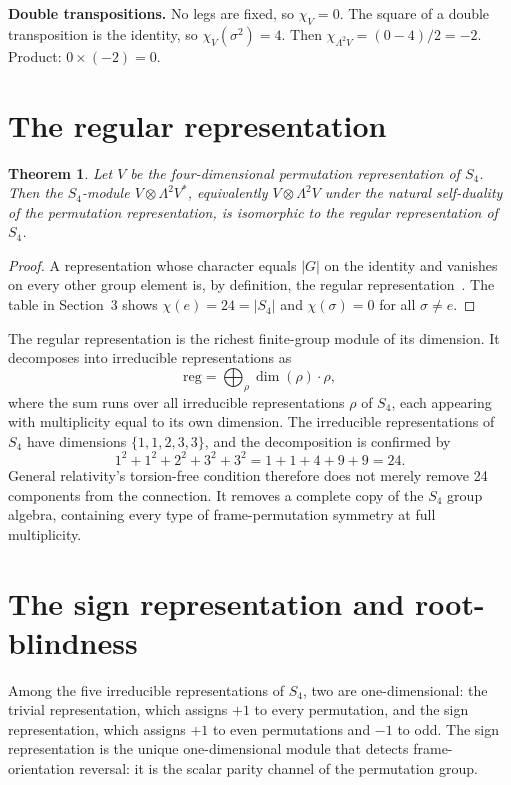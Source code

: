 \documentclass[11pt]{article}
\newtheorem{theorem}{Theorem}
\begin{document}
\textbf{Double transpositions.}  No legs are fixed, so $\chi_V=0$.
The square of a double transposition is the identity, so
$\chi_V(\sigma^2)=4$.  Then $\chi_{\Lambda^2V}=(0-4)/2=-2$.
Product: $0\times(-2)=0$.


\section{The regular representation}

\begin{theorem}
Let $V$ be the four-dimensional permutation representation of $S_4$.
Then the $S_4$-module $V\otimes\Lambda^2V^*$, equivalently
$V\otimes\Lambda^2V$ under the natural self-duality of the
permutation representation, is isomorphic to the regular
representation of $S_4$.
\end{theorem}

\begin{proof}
A representation whose character equals $|G|$ on the identity and
vanishes on every other group element is, by definition, the
regular representation~\cite{FultonHarris,Serre}.  The table in
Section~3 shows $\chi(e)=24=|S_4|$ and $\chi(\sigma)=0$ for all
$\sigma\neq e$.
\end{proof}

The regular representation is the richest finite-group module
of its dimension.  It decomposes into irreducible representations
as
\[
        \text{reg} = \bigoplus_\rho \dim(\rho)\cdot\rho,
\]
where the sum runs over all irreducible representations $\rho$ of
$S_4$, each appearing with multiplicity equal to its own
dimension.  The irreducible representations of $S_4$ have
dimensions $\{1,1,2,3,3\}$, and the decomposition is confirmed by
\[
        1^2 + 1^2 + 2^2 + 3^2 + 3^2 = 1+1+4+9+9 = 24.
\]
General relativity's torsion-free condition therefore does not
merely remove 24 components from the connection.  It removes a
complete copy of the $S_4$ group algebra, containing every type of
frame-permutation symmetry at full multiplicity.


\section{The sign representation and root-blindness}

Among the five irreducible representations of $S_4$, two are
one-dimensional: the trivial representation, which assigns $+1$ to
every permutation, and the sign representation, which assigns $+1$
to even permutations and $-1$ to odd.  The sign representation is
the unique one-dimensional module that detects frame-orientation
reversal: it is the scalar parity channel of the permutation group.
\end{document}
